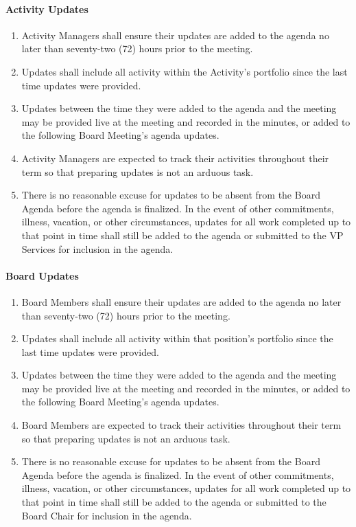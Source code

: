 \paragraph{Activity Updates}
\begin{enumerate}
 \item
  Activity Managers shall ensure their updates are added to the agenda no later than seventy-two (72) hours prior to the meeting.
 \item
  Updates shall include all activity within the Activity's portfolio since the last time updates were provided.
 \item
  Updates between the time they were added to the agenda and the meeting may be provided live at the meeting and recorded in the minutes, or added to the following Board Meeting's agenda updates.
 \item
  Activity Managers are expected to track their activities throughout their term so that preparing updates is not an arduous task.
 \item
  There is no reasonable excuse for updates to be absent from the Board Agenda before the agenda is finalized. In the event of other commitments, illness, vacation, or other circumstances, updates for all work completed up to that point in time shall still be added to the agenda or submitted to the VP Services for inclusion in the agenda.
\end{enumerate}

\paragraph{Board Updates}
\begin{enumerate}
 \item
  Board Members shall ensure their updates are added to the agenda no later than seventy-two (72) hours prior to the meeting.
 \item
  Updates shall include all activity within that position's portfolio since the last time updates were provided.
 \item
  Updates between the time they were added to the agenda and the meeting may be provided live at the meeting and recorded in the minutes, or added to the following Board Meeting's agenda updates.
 \item
  Board Members are expected to track their activities throughout their term so that preparing updates is not an arduous task.
 \item
  There is no reasonable excuse for updates to be absent from the Board Agenda before the agenda is finalized. In the event of other commitments, illness, vacation, or other circumstances, updates for all work completed up to that point in time shall still be added to the agenda or submitted to the Board Chair for inclusion in the agenda.
\end{enumerate}

